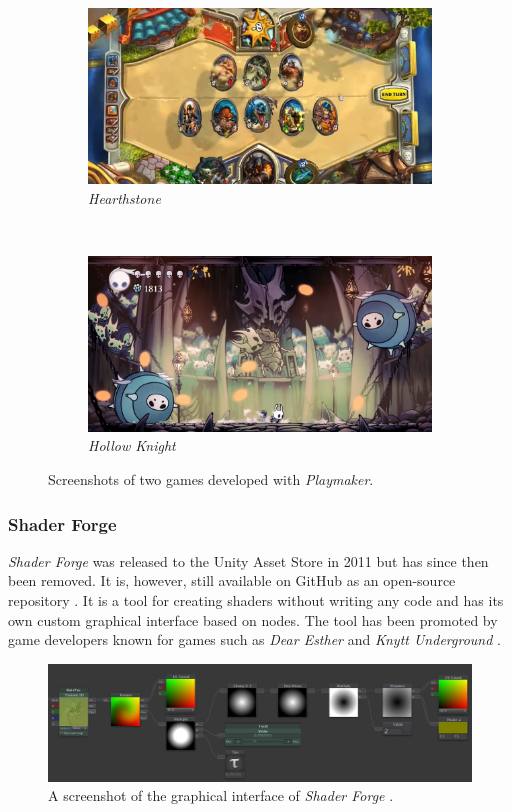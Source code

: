 \begin{figure}[H]
\centering
\begin{subfigure}{.48\linewidth}
  \centering
  \includegraphics[width=1\linewidth]{Planning report/images/hearthstone-game.png}
  \caption{\textit{Hearthstone}}
  \label{fig:hearthstone-game}
\end{subfigure}
~
\begin{subfigure}{.48\linewidth}
  \centering
  \includegraphics[width=1\linewidth]{Planning report/images/hollow_knight-game.png}
  \caption{\textit{Hollow Knight}}
  \label{fig:hollow-knight-game}
\end{subfigure}
\caption{Screenshots of two games developed with \textit{Playmaker}.}
\label{fig:playmaker-games}
\end{figure}

\subsubsection{Shader Forge}
\textit{Shader Forge} was released to the Unity Asset Store in 2011 \cite{unity-shadow-forge-forum} but has since then been removed. It is, however, still available on GitHub as an open-source repository \cite{unity-shadow-forge-github}. It is a tool for creating shaders without writing any code and has its own custom graphical interface based on nodes. The tool has been promoted by game developers known for games such as \textit{Dear Esther} and \textit{Knytt Underground} \cite{unity-shadow-forge}.

\begin{figure}[H]
    \centering
    \includegraphics[width = \textwidth]{Planning report/images/unity-shader-forge.jpg}
    \caption{A screenshot of the graphical interface of \textit{Shader Forge} \cite{unity-shadow-forge-forum}.}
    \label{fig:shader-forge-editor}
\end{figure}